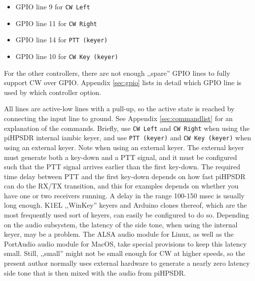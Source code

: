 \documentclass[12pt]{book}
\def\bltt#1{\texttt{\color{blue}#1}}
\def\pH{pi\-HPSDR\xspace}
\begin{document}
\begin{itemize}
\item{GPIO line 9 for \bltt{CW Left}}
\item{GPIO line 11 for \bltt{CW Right}}
\item{GPIO line 14 for \bltt{PTT (keyer)}}
\item{GPIO line 10 for \bltt{CW Key (keyer)}}
\end{itemize}

For the other controllers, there are not enough ,,spare'' GPIO lines to fully
support CW over GPIO. Appendix \ref{sec:gpio} lists in detail which GPIO line
is used by which controller option.

All lines are active-low lines with a pull-up, so the active state is reached
by connecting the input line to ground. See Appendix \ref{sec:commandlist} for
an explanation of the commands. Briefly, use \bltt{CW Left} and \bltt{CW Right}
when using the \pH internal iambic keyer, and use \bltt{PTT (keyer)} and
\bltt{CW Key (keyer)} when using an external keyer. Note when using an external
keyer. The external keyer must generate both a key-down and a PTT signal, and it must be configured
such that the PTT signal arrives earlier than the first key-down. The required time
delay between PTT and the first key-down depends  on how fast \pH can do the
RX/TX transition, and this for examples depends on whether you have one or two receivers
running. A delay in the range 100-150 msec is usually long enough.
K1EL ,,WinKey'' keyers and Arduino clones thereof, which are the most frequently
used sort
of keyers, can easily be configured to do so. Depending on the audio subsystem,
the latency of the side tone, when using the internal keyer, may be a problem.
The ALSA audio module for Linux, as well as the PortAudio audio  module for MacOS,
 take special provisions to keep this latency small. Still, ,,small'' might not
 be small enough for CW at higher speeds, so the present author normally uses
 external hardware to generate a nearly zero latency side tone that is then
 mixed with the audio from \pH.
\end{document}
